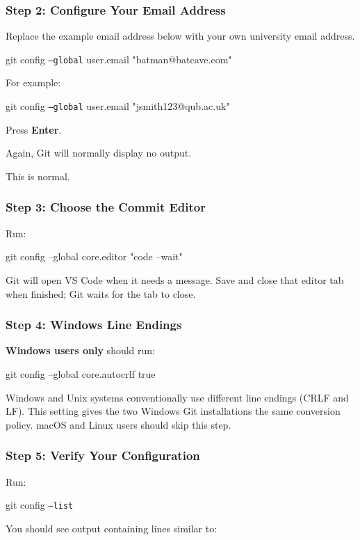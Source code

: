 \documentclass{csc2059practical}
\begin{document}
\subsubsection{Step 2: Configure Your Email Address}
Replace the example email address below with your own university email address.

\begin{terminalplain}
git config \texttt{--global} user.email "batman@batcave.com"
\end{terminalplain}
For example:

\begin{terminalplain}
git config \texttt{--global} user.email "jsmith123@qub.ac.uk"
\end{terminalplain}
Press \textbf{Enter}.

Again, Git will normally display no output.

This is normal.

\subsubsection{Step 3: Choose the Commit Editor}
Run:
\begin{bashcode}
git config --global core.editor "code --wait"
\end{bashcode}
Git will open VS Code when it needs a message. Save and close that editor tab when finished; Git waits for the tab to close.

\subsubsection{Step 4: Windows Line Endings}
\textbf{Windows users only} should run:
\begin{bashcode}
git config --global core.autocrlf true
\end{bashcode}
Windows and Unix systems conventionally use different line endings (CRLF and LF). This setting gives the two Windows Git installations the same conversion policy. macOS and Linux users should skip this step.

\subsubsection{Step 5: Verify Your Configuration}
Run:

\begin{terminalplain}
git config \texttt{--list}
\end{terminalplain}
You should see output containing lines similar to:
\end{document}
